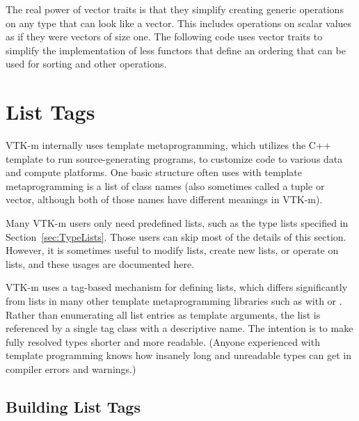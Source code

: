 
The real power of vector traits is that they simplify creating generic
operations on any type that can look like a vector. This includes
operations on scalar values as if they were vectors of size one. The
following code uses vector traits to simplify the implementation of less
functors that define an ordering that can be used for sorting
and other operations.




\section{List Tags}
\label{sec:ListTags}


VTK-m internally uses template metaprogramming, which utilizes the C++
template to run source-generating programs, to customize code to various
data and compute platforms. One basic structure often uses with template
metaprogramming is a list of class names (also sometimes called a tuple or
vector, although both of those names have different meanings in VTK-m).

Many VTK-m users only need predefined lists, such as the type lists
specified in Section~\ref{sec:TypeLists}. Those users can skip most of the
details of this section. However, it is sometimes useful to modify lists,
create new lists, or operate on lists, and these usages are documented
here.

VTK-m uses a tag-based mechanism for defining lists, which differs
significantly from lists in many other template metaprogramming libraries
such as with  or
. Rather than enumerating all list
entries as template arguments, the list is referenced by a single tag class
with a descriptive name. The intention is to make fully resolved types
shorter and more readable. (Anyone experienced with template programming
knows how insanely long and unreadable types can get in compiler errors and
warnings.)

\subsection{Building List Tags}
\label{sec:BuildingListTags}

